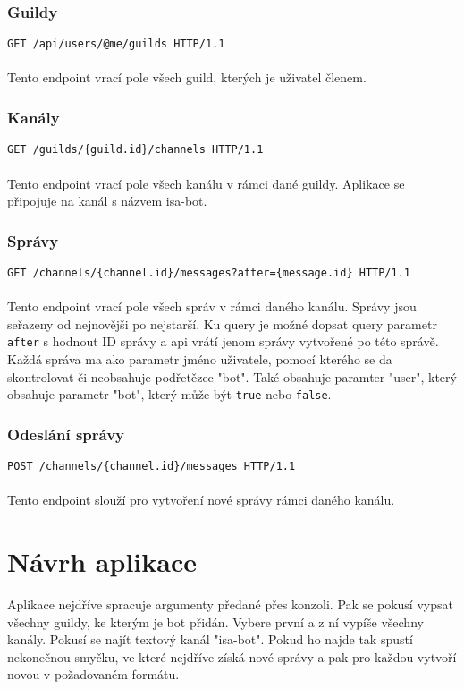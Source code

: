 \documentclass[a4paper,11pt]{article}
\begin{document}
\subsubsection{Guildy}
\texttt{GET /api/users/@me/guilds HTTP/1.1}\\\\
Tento endpoint vrací pole všech guild, kterých je uživatel členem.

\subsubsection{Kanály}
\texttt{GET /guilds/\{guild.id\}/channels HTTP/1.1}\\\\
Tento endpoint vrací pole všech kanálu v rámci dané guildy. Aplikace se připojuje na kanál s názvem isa-bot.

\subsubsection{Správy}
\texttt{GET /channels/\{channel.id\}/messages?after=\{message.id\} HTTP/1.1}\\\\
Tento endpoint vrací pole všech správ v rámci daného kanálu. Správy jsou seřazeny od nejnovějši po nejstarší. Ku query je možné dopsat query parametr \texttt{after} s hodnout ID správy a api vrátí jenom správy vytvořené po této správě.
Každá správa ma ako parametr jméno uživatele, pomocí kterého se da skontrolovat či neobsahuje podřetězec "bot". Také obsahuje paramter "user", který obsahuje parametr "bot", který může být \texttt{true} nebo \texttt{false}.

\subsubsection{Odeslání správy}
\texttt{POST /channels/\{channel.id\}/messages HTTP/1.1}\\\\
Tento endpoint slouží pro vytvoření nové správy  rámci daného kanálu.

\section{Návrh aplikace}
Aplikace nejdříve spracuje argumenty předané přes konzoli. Pak se pokusí vypsat všechny guildy, ke kterým je bot přidán. Vybere první a z ní vypíše všechny kanály. Pokusí se najít textový kanál "isa-bot". Pokud ho najde tak spustí nekonečnou smyčku, ve které nejdříve získá nové správy a pak pro každou vytvoří novou v požadovaném formátu.
\end{document}
